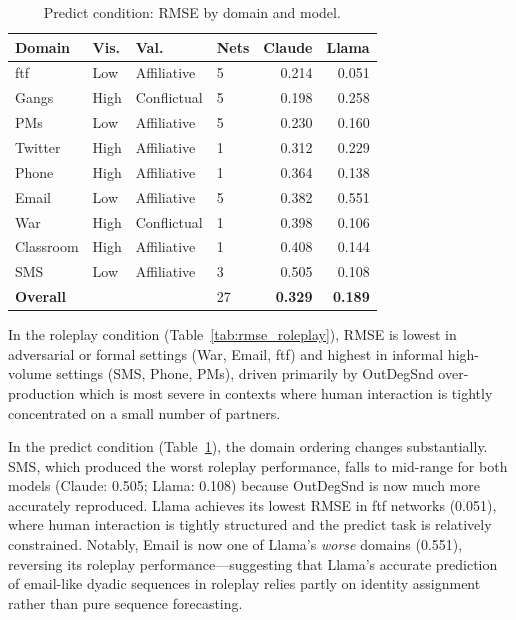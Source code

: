 \documentclass[11pt]{article}
\begin{document}
\begin{table}[H]
\centering
\caption{Predict condition: RMSE by domain and model.}
\label{tab:rmse_predict}
\begin{tabular}{llllrr}
\toprule
\textbf{Domain} & \textbf{Vis.} & \textbf{Val.} &
\textbf{Nets} & \textbf{Claude} & \textbf{Llama} \\
\midrule
ftf       & Low  & Affiliative & 5 & 0.214 & 0.051 \\
Gangs     & High & Conflictual & 5 & 0.198 & 0.258 \\
PMs       & Low  & Affiliative & 5 & 0.230 & 0.160 \\
Twitter   & High & Affiliative & 1 & 0.312 & 0.229 \\
Phone     & High & Affiliative & 1 & 0.364 & 0.138 \\
Email     & Low  & Affiliative & 5 & 0.382 & 0.551 \\
War       & High & Conflictual & 1 & 0.398 & 0.106 \\
Classroom & High & Affiliative & 1 & 0.408 & 0.144 \\
SMS       & Low  & Affiliative & 3 & 0.505 & 0.108 \\
\midrule
\textbf{Overall} & & & 27 & \textbf{0.329} & \textbf{0.189} \\
\bottomrule
\end{tabular}
\end{table}

In the roleplay condition (Table~\ref{tab:rmse_roleplay}), RMSE is
lowest in adversarial or formal settings (War, Email, ftf) and highest
in informal high-volume settings (SMS, Phone, PMs), driven primarily by
OutDegSnd over-production which is most severe in contexts where human
interaction is tightly concentrated on a small number of partners.

In the predict condition (Table~\ref{tab:rmse_predict}), the domain
ordering changes substantially. SMS, which produced the worst roleplay
performance, falls to mid-range for both models (Claude: 0.505; Llama:
0.108) because OutDegSnd is now much more accurately reproduced. Llama
achieves its lowest RMSE in ftf networks (0.051), where human interaction
is tightly structured and the predict task is relatively constrained.
Notably, Email is now one of Llama's \emph{worse} domains (0.551),
reversing its roleplay performance---suggesting that Llama's accurate
prediction of email-like dyadic sequences in roleplay relies partly on
identity assignment rather than pure sequence forecasting.
\end{document}
